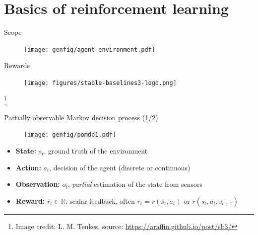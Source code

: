 \documentclass[10pt, aspectratio=1610]{beamer}
\newcommand\blfootnote[1]{%
  \begingroup
  \renewcommand\thefootnote{}%
  \footnote{#1}%
  \addtocounter{footnote}{-1}%
  \endgroup
}
\begin{document}

\section*{Basics of reinforcement learning}

\begin{frame}{Scope}
    \begin{figure}
        \texttt{[image: genfig/agent-environment.pdf]}
    \end{figure}
\end{frame}

\begin{frame}{Rewards}
    \begin{figure}
        \texttt{[image: figures/stable-baselines3-logo.png]}
    \end{figure}
    \blfootnote{
        Image credit: L. M. Tenkes, source: \url{https://araffin.github.io/post/sb3/}
    }
\end{frame}

\begin{frame}{Partially observable Markov decision process (1/2)}
    \begin{figure}
        \texttt{[image: genfig/pomdp1.pdf]}
    \end{figure}
    \begin{itemize}
        \item \textbf{State:} $s_t$, ground truth of the environment
        \item \textbf{Action:} $a_t$, decision of the agent (discrete or continuous)
        \item \textbf{Observation:} $o_t$, \emph{partial} estimation of the state from sensors
        \item \textbf{Reward:} $r_t \in \mathbb{R}$, scalar feedback, often $r_t = r(s_t, a_t)$ or $r(s_t, a_t, s_{t+1})$
    \end{itemize}
    \vspace{-1em}
\end{frame}
\end{document}
